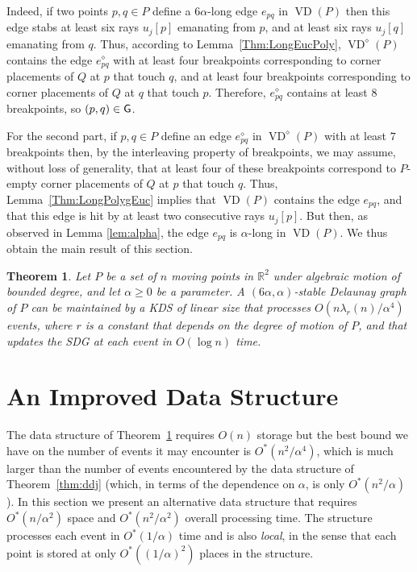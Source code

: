 \documentclass[letter,11pt]{article}
\newtheorem{theorem}{Theorem}[section]
\def \reals{{\mathbb R}}
\def\poly{\diamond}
\def\G{{\sf G}}
\def\VD{\mathop{\mathrm{VD}}}
\begin{document}
Indeed, if two points $p,q\in P$ define a $6\alpha$-long edge $e_{pq}$ in $\VD(P)$ then
this edge stabs at least six rays $u_j[p]$ emanating from $p$, and at least six rays $u_j[q]$ emanating from $q$.
Thus, according to Lemma~\ref{Thm:LongEucPoly}, $\VD^\poly(P)$ contains the edge $e_{pq}^\poly$ with at least four breakpoints corresponding to corner placements of $Q$ at $p$ that touch $q$, and at least four breakpoints corresponding to corner placements of $Q$ at $q$ that touch $p$. Therefore, $e_{pq}^\poly$ contains at least $8$ breakpoints, so $(p,q)\in \G$.

For the second part, if $p,q\in P$ define an edge $e_{pq}^\poly$ in $\VD^\poly(P)$ with at least $7$ breakpoints then, by the interleaving property of breakpoints, we may assume, without loss of generality, that at least four of these breakpoints correspond to $P$-empty corner placements of $Q$ at $p$ that touch $q$.
Thus, Lemma~\ref{Thm:LongPolygEuc} implies that $\VD(P)$ contains the edge $e_{pq}$, and that this edge is hit by at least two consecutive rays $u_j[p]$.
But then, as observed in Lemma \ref{lem:alpha}, the edge $e_{pq}$ is $\alpha$-long in $\VD(P)$.
We thus obtain the main result of this section.
 
\begin{theorem}\label{Thm:MaintainSDGPolyg}
Let $P$ be a set of $n$ moving points in $\reals^2$ under algebraic
motion of bounded degree, 
and let $\alpha \ge 0$ be a parameter.  A
$(6\alpha,\alpha)$-stable Delaunay graph of $P$ can be maintained by a 
KDS of linear size that processes
 $O(n\lambda_r(n)/\alpha^4)$ events, where $r$ is a
constant that depends on the degree of motion of $P$, and that 
updates the SDG  at each event in $O(\log n)$ time.
\end{theorem}


\section{An Improved Data Structure}
\label{Sec:ReduceS}

The data structure of Theorem~\ref{Thm:MaintainSDGPolyg} requires
$O(n)$ storage but the best bound we have on the number of
events it may encounter is $O^*(n^2/\alpha^4)$, which is 
much larger than the number of events encountered by the data structure
of Theorem~\ref{thm:ddj} (which, in terms of the dependence on $\alpha$, is only $O^*(n^2/\alpha)$).  In this
section we present an alternative data structure that requires
$O^*(n/\alpha^2)$ space and $O^*(n^2/\alpha^2)$ overall processing
time.  The structure processes each event in $O^*(1/\alpha)$ time and is also {\it local}, in the sense that each point is stored at only $O^*((1/\alpha)^2)$ places in the structure. 
\end{document}
